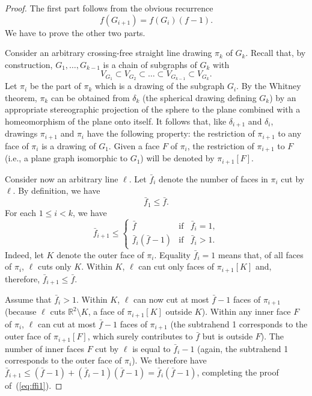 \documentclass[reqno,12pt]{amsart}
\newcommand{\ff}{{\bar f}}
\newcommand{\reals}{\mathbb{R}}
\newcommand{\refeq}[1]{(\ref{eq:#1})}
\begin{document}
\begin{proof}
The first part follows from the obvious recurrence
$$
f(G_{i+1})=f(G_i)(f-1).
$$
We have to prove the other two parts.

Consider an arbitrary crossing-free straight line drawing $\pi_k$ of $G_k$.
Recall that, by construction, $G_1,\ldots,G_{k-1}$ is a chain of subgraphs of $G_k$ with
$$
V_{G_1}\subset V_{G_2}\subset\ldots\subset V_{G_{k-1}}\subset V_{G_k}.
$$
Let $\pi_i$ be the part of $\pi_k$ which is a drawing of the subgraph $G_i$.
By the Whitney theorem, $\pi_k$ can be obtained from $\delta_k$ (the spherical
drawing defining $G_k$) by an appropriate stereographic projection of the sphere
to the plane combined with a homeomorphism of the plane onto itself.
It follows that, like $\delta_{i+1}$ and $\delta_i$, drawings $\pi_{i+1}$ and $\pi_i$
have the following property: the restriction of $\pi_{i+1}$ to any face of $\pi_i$
is a drawing of $G_1$.
Given a face $F$ of $\pi_i$, the restriction of $\pi_{i+1}$ to $F$ (i.e., a plane
graph isomorphic to $G_1$) will be denoted by $\pi_{i+1}[F]$. 

Consider now an arbitrary line $\ell$. Let $\ff_i$ denote the number of faces
in $\pi_i$ cut by $\ell$. By definition, we have
\begin{equation}\label{eq:f1f}
\ff_1\le\ff.
\end{equation}
For each $1\le i<k$, we have 
\begin{equation}\label{eq:ffi1}
\ff_{i+1}\le
\left\{
\begin{array}{lcl}
\ff&\mathrm{if}&\ff_i=1,\\[1mm]
\ff_i(\ff-1)&\mathrm{if}&\ff_i>1.
\end{array}
\right.
\end{equation}
Indeed, let $K$ denote the outer face of $\pi_i$.
Equality $\ff_i=1$ means that, of all faces of $\pi_i$, $\ell$ cuts only $K$.
Within $K$, $\ell$ can cut only faces of $\pi_{i+1}[K]$ and, therefore, $\ff_{i+1}\le\ff$.

Assume that $\ff_i>1$. Within $K$, $\ell$ can now cut at most $\ff-1$ faces of $\pi_{i+1}$
(because $\ell$ cuts $\reals^2\setminus K$, a face of $\pi_{i+1}[K]$ outside $K$).
Within any inner face $F$ of $\pi_i$, $\ell$ can cut
at most $\ff-1$ faces of $\pi_{i+1}$ (the subtrahend 1 corresponds to the outer face
of $\pi_{i+1}[F]$, which surely contributes to $\ff$ but
is outside $F$). The number of inner faces $F$ cut by $\ell$ is equal to
$\ff_i-1$ (again, the subtrahend 1 corresponds to the outer face of $\pi_i$).
We therefore have 
$\ff_{i+1}\le(\ff-1)+(\ff_i-1)(\ff-1)=\ff_i(\ff-1)$,
completing the proof of~\refeq{ffi1}.


\end{proof}
\end{document}
